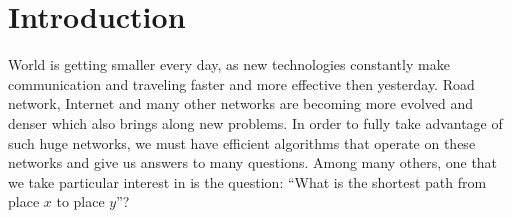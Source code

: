 \documentclass[a4paper]{article}
\begin{document}
    \pagebreak


    \tableofcontents

    \pagebreak

    \pagestyle{plain}
    \setcounter{page}{1}
    \setlength{\parindent}{40pt}


    \section{Introduction}
    World is getting smaller every day, as new technologies constantly make communication and traveling faster and more effective then yesterday. Road network, Internet and many other networks are becoming more evolved and denser which also brings along new problems. In order to fully take advantage of such huge networks, we must have efficient algorithms that operate on these networks and give us answers to many questions. Among many others, one that we take particular interest in is the question: ``What is the shortest path from place $x$ to place $y$''?

\end{document}
